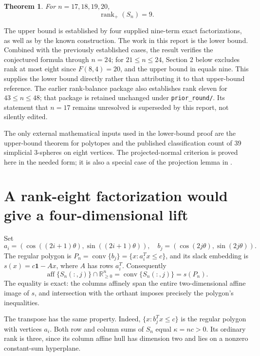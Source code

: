 \documentclass[11pt]{article}
\newtheorem{theorem}{Theorem}[section]
\theoremstyle{definition}
\newcommand{\rankp}{\operatorname{rank}_{+}}
\newcommand{\aff}{\operatorname{aff}}
\newcommand{\conv}{\operatorname{conv}}
\newcommand{\R}{\mathbb R}
\newcommand{\one}{\mathbf 1}
\begin{document}
\begin{theorem}\label{thm:main}
For $n=17,18,19,20$,
\[
 \boxed{\rankp(S_n)=9.}
\]
\end{theorem}
The upper bound is established by four supplied nine-term exact factorizations, as well as by the known construction. The work in this report is the lower bound. Combined with the previously established cases, the result verifies the conjectured formula through $n=24$; for $21\le n\le24$, Section 2 below excludes rank at most eight since $F(8,4)=20$, and the upper bound in \cite{vgg} equals nine. This supplies the lower bound directly rather than attributing it to that upper-bound reference. The earlier rank-balance package also establishes rank eleven for $43\le n\le48$; that package is retained unchanged under \texttt{prior\_round/}. Its statement that $n=17$ remains unresolved is superseded by this report, not silently edited.

The only external mathematical inputs used in the lower-bound proof are the upper-bound theorem for polytopes and the published classification count of 39 simplicial 3-spheres on eight vertices. The projected-normal criterion is proved here in the needed form; it is also a special case of the projection lemma in \cite{rs}.

\section{A rank-eight factorization would give a four-dimensional lift}
Set
\[
 a_i=(\cos((2i+1)\theta),\sin((2i+1)\theta)),\quad
 b_j=(\cos(2j\theta),\sin(2j\theta)).
\]
The regular polygon is $P_n=\conv\{b_j\}=\{x:a_i^Tx\le c\}$, and its slack embedding is $s(x)=c\one-Ax$, where $A$ has rows $a_i^T$. Consequently
\begin{equation}\label{eq:section}
 \aff\{S_n(:,j)\}\cap\R^n_{\ge0}=\conv\{S_n(:,j)\}=s(P_n).
\end{equation}
The equality is exact: the columns affinely span the entire two-dimensional affine image of $s$, and intersection with the orthant imposes precisely the polygon's inequalities.

The transpose has the same property. Indeed, $\{x:b_j^Tx\le c\}$ is the regular polygon with vertices $a_i$. Both row and column sums of $S_n$ equal $\kappa=nc>0$. Its ordinary rank is three, since its column affine hull has dimension two and lies on a nonzero constant-sum hyperplane.
\end{document}
